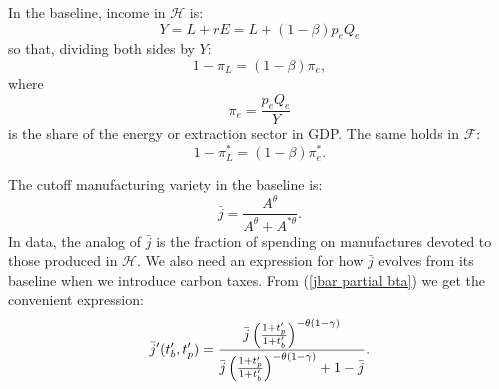 \documentclass[notitlepage,12pt]{article}
\begin{document}
In the baseline, income in $\mathcal{H}$ is:%
\begin{equation*}
Y=L+rE=L+(1-\beta )p_{e}Q_{e}
\end{equation*}%
so that, dividing both sides by $Y$:%
\begin{equation*}
1-\pi _{L}=(1-\beta )\pi _{e},
\end{equation*}%
where%
\begin{equation*}
\pi _{e}=\frac{p_{e}Q_{e}}{Y}
\end{equation*}%
is the share of the energy or extraction sector in GDP. The same holds in $%
\mathcal{F}$:%
\begin{equation*}
1-\pi _{L}^{\ast }=(1-\beta )\pi _{e}^{\ast }.
\end{equation*}

The cutoff manufacturing variety in the baseline is:%
\begin{equation*}
\bar{j}=\frac{A^{\theta }}{A^{\theta }+A^{\ast \theta }}.
\end{equation*}%
In data, the analog of $\bar{j}$ is the fraction of spending on manufactures
devoted to those produced in $\mathcal{H}$. We also need an expression for
how $\bar{j}$ evolves from its baseline when we introduce carbon taxes. From
(\ref{jbar partial bta}) we get the convenient expression:%
\begin{equation}
\bar{j}^{\prime }(t_{b}^{\prime },t_{p}^{\prime })=\frac{\bar{j}\left( \frac{%
1+t_{p}^{\prime }}{1+t_{b}^{\prime }}\right) ^{-\theta \left( 1-\gamma
\right) }}{\bar{j}\left( \frac{1+t_{p}^{\prime }}{1+t_{b}^{\prime }}\right)
^{-\theta \left( 1-\gamma \right) }+1-\bar{j}}.  \label{jbar prime}
\end{equation}
\end{document}
